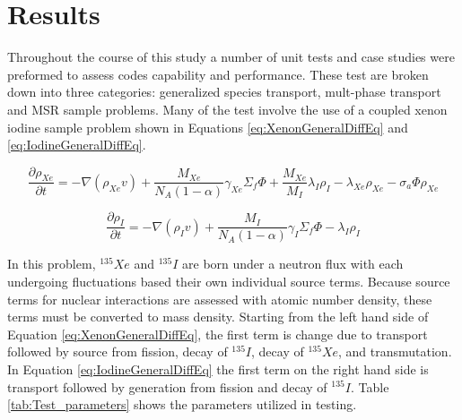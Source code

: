 \chapter{Results} \label{ch:Results}
Throughout the course of this study a number of unit tests and case studies were preformed to assess codes capability and performance. These test are broken down into three categories: generalized species transport, mult-phase transport and MSR sample problems. Many of the test involve the use of a coupled xenon iodine sample problem shown in Equations \ref{eq:XenonGeneralDiffEq} and \ref{eq:IodineGeneralDiffEq}.

\begin{equation}
    \frac{\partial \rho_{Xe}}{\partial t} = -\nabla (\rho_{Xe}v) + \frac{M_{Xe}}{N_{A} (1-\alpha)} \gamma_{Xe}\Sigma_{f}\Phi + \frac{M_{Xe}}{M_{I}}\lambda_{I}\rho_{I} - \lambda_{Xe}\rho_{Xe} - \sigma_{a}\Phi\rho_{Xe}
    \label{eq:XenonGeneralDiffEq}
\end{equation}

\begin{equation}
    \frac{\partial \rho_{I}}{\partial t} = -\nabla (\rho_{I}v) + \frac{M_{I}}{N_{A}(1-\alpha)} \gamma_{I}\Sigma_{f}\Phi - \lambda_{I}\rho_{I}
    \label{eq:IodineGeneralDiffEq}
\end{equation}

In this problem, ${}^{135}Xe$ and ${}^{135}I$ are born under a neutron flux with each undergoing fluctuations based their own individual source terms. Because source terms for nuclear interactions are assessed with atomic number density, these terms must be converted to mass density. Starting from the left hand side of Equation \ref{eq:XenonGeneralDiffEq}, the first term is change due to transport followed by source from fission, decay of ${}^{135}I$, decay of ${}^{135}Xe$, and transmutation. In Equation \ref{eq:IodineGeneralDiffEq} the first term on the right hand side is transport followed by generation from fission and decay of ${}^{135}I$. Table \ref{tab:Test_parameters} shows the parameters utilized in testing. 

